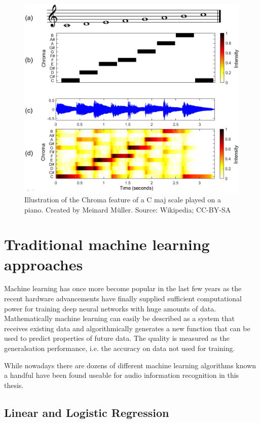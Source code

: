 \begin{figure}[p]
    \centering
	\includegraphics[width=.85\textwidth]{./images/illustrations/chroma}
    \caption{Illustration of the Chroma feature of a C maj scale played on a piano. Created by Meinard Müller. Source: Wikipedia; CC-BY-SA}
    \label{fig:chroma}
\end{figure}



\section{Traditional machine learning approaches}


Machine learning has once more become popular in the last few years as the recent hardware advancements have finally supplied sufficient computational power for training deep neural networks with huge amounts of data.
Mathematically machine learning can easily be described as a system that receives existing data and algorithmically generates a new function that can be used to predict properties of future data.
The quality is measured as the generalsation performance, i.e. the accuracy on data not used for training.

While nowadays there are dozens of different machine learning algorithms known a handful have been found useable for audio information recognition in this thesis.


\subsection{Linear and Logistic Regression}
\label{chptr:reg}

